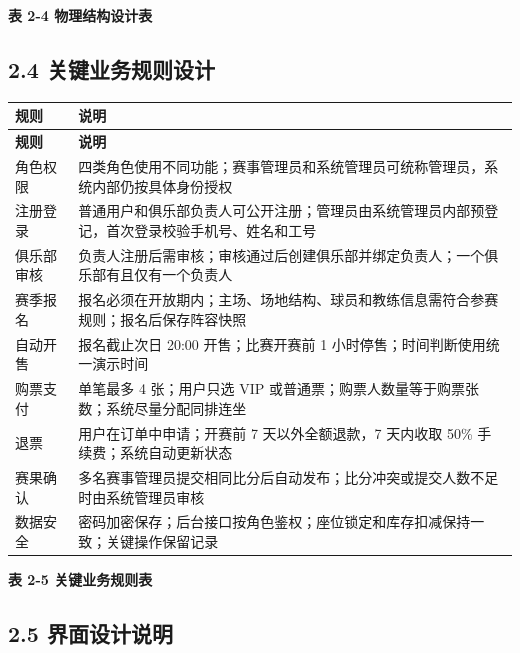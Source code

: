 \documentclass[UTF8,zihao=-4,a4paper]{ctexart}
\newcommand{\tablecaptionline}[1]{\vspace{-1.6em}\begin{center}\small\bfseries #1\end{center}\vspace{0.2em}}
\begin{document}
\tablecaptionline{表 2-4 物理结构设计表}

\subsection*{2.4 关键业务规则设计}
{}


\begin{center}
\small
\begin{longtable}{>{\raggedright\arraybackslash}p{} >{\raggedright\arraybackslash}p{}}
\toprule
\rowcolor{tablehead}
\textbf{规则} & \textbf{说明} \\
\midrule
\endfirsthead
\toprule
\rowcolor{tablehead}
\textbf{规则} & \textbf{说明} \\
\midrule
\endhead
角色权限 & 四类角色使用不同功能；赛事管理员和系统管理员可统称管理员，系统内部仍按具体身份授权 \\
\midrule
注册登录 & 普通用户和俱乐部负责人可公开注册；管理员由系统管理员内部预登记，首次登录校验手机号、姓名和工号 \\
\midrule
俱乐部审核 & 负责人注册后需审核；审核通过后创建俱乐部并绑定负责人；一个俱乐部有且仅有一个负责人 \\
\midrule
赛季报名 & 报名必须在开放期内；主场、场地结构、球员和教练信息需符合参赛规则；报名后保存阵容快照 \\
\midrule
自动开售 & 报名截止次日 20:00 开售；比赛开赛前 1 小时停售；时间判断使用统一演示时间 \\
\midrule
购票支付 & 单笔最多 4 张；用户只选 VIP 或普通票；购票人数量等于购票张数；系统尽量分配同排连坐 \\
\midrule
退票 & 用户在订单中申请；开赛前 7 天以外全额退款，7 天内收取 50\% 手续费；系统自动更新状态 \\
\midrule
赛果确认 & 多名赛事管理员提交相同比分后自动发布；比分冲突或提交人数不足时由系统管理员审核 \\
\midrule
数据安全 & 密码加密保存；后台接口按角色鉴权；座位锁定和库存扣减保持一致；关键操作保留记录 \\
\midrule
\bottomrule
\end{longtable}
\end{center}

\tablecaptionline{表 2-5 关键业务规则表}

\subsection*{2.5 界面设计说明}
{}
\end{document}
